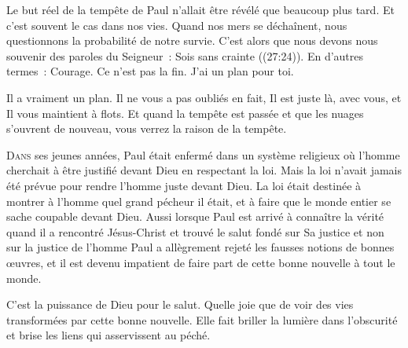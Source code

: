 Le but réel de la tempête de Paul n'allait être révélé que beaucoup plus tard.
 Et c'est souvent le cas dans nos vies. Quand nos mers se déchaînent,
 nous questionnons la probabilité de notre survie.
 C'est alors que nous devons nous souvenir des paroles du Seigneur~:
 \og Sois sans crainte \fg{} ((27:24)).
 En d'autres termes~: 
 \og Courage. Ce n'est pas la fin. J'ai un plan pour toi. \fg{}

Il a vraiment un plan. Il ne vous a pas oubliés \ocadr en fait,
 Il est juste là, avec vous, et Il vous maintient à flots.
 Et quand la tempête est passée et que les nuages s'ouvrent de nouveau,
 vous verrez la raison de la tempête.

\dvrule






\lettrine{D}{ans} ses jeunes années, Paul était enfermé
 dans un système religieux où l'homme cherchait à être justifié
 devant Dieu en respectant la loi. 
 Mais la loi  n'avait jamais été prévue pour rendre
 l'homme juste devant Dieu. La loi était destinée à montrer
 à l'homme quel grand pécheur il était, et à faire que le monde entier
 se sache coupable devant Dieu. Aussi lorsque Paul est arrivé
 à connaître la vérité \ocadr quand il a rencontré Jésus-Christ
 et trouvé le salut fondé sur Sa justice et non sur la justice
 de l'homme \fcadr{} Paul a allègrement rejeté les fausses notions
 de bonnes \oe{}uvres, et il est devenu impatient de faire part
 de cette bonne nouvelle à tout le monde.


\og C'est la puissance de Dieu pour le salut. \fg{}
 Quelle joie que de voir des vies transformées par cette bonne nouvelle.
 Elle fait briller la lumière dans l'obscurité et brise les liens
 qui asservissent au péché.

